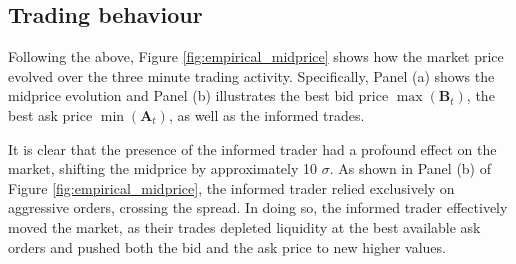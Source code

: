 \subsection{Trading behaviour}
Following the above, Figure \ref{fig:empirical_midprice} shows how the market price evolved over the three minute trading activity. Specifically, Panel (a) shows the midprice evolution and Panel (b) illustrates the best bid price $\max(\mathbf{B}_t)$, the best ask price $\min(\mathbf{A}_t)$, as well as the informed trades. 

It is clear that the presence of the informed trader had a profound effect on the market, shifting the midprice by approximately 10 $\sigma$. As shown in Panel (b) of Figure \ref{fig:empirical_midprice}, the informed trader relied exclusively on aggressive orders, crossing the spread. In doing so, the informed trader effectively moved the market, as their trades depleted liquidity at the best available ask orders and pushed both the bid and the ask price to new higher values. 

